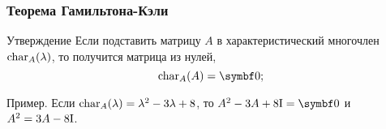 







    


 
\begin{frame}
    \frametitle{Теорема Гамильтона-Кэли}

    \begin{block}{Утверждение}
        Если подставить матрицу $A$ в характеристический многочлен $\operatorname{char}_A(\lambda)$, то получится матрица из нулей,
        \[
        \charp_A(A) = \bzero;     
        \]
    \end{block}



    \pause
    \vspace{10pt}
    Пример. Если $\operatorname{char}_A(\lambda) = \lambda^2 - 3\lambda + 8$, то $A^2 - 3A + 8\Id = \bzero$ и 
    $A^2 = 3A - 8\mathrm{I}$. 
    

\end{frame}
